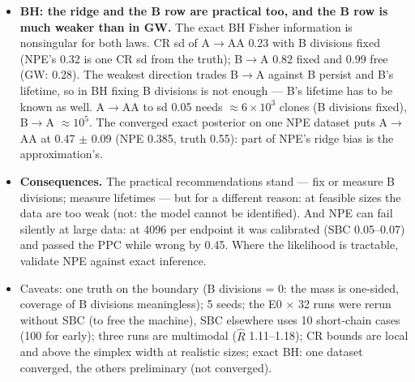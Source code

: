 \documentclass[10pt,a4paper]{article}
\newcommand{\code}[1]{\texttt{\detokenize{#1}}}
\begin{document}
\begin{itemize}
\item \textbf{BH: the ridge and the B row are practical too, and the B row is much weaker than in GW.} The exact BH Fisher information is nonsingular for both laws. CR sd of A$\to$AA 0.23 with B divisions fixed (NPE's 0.32 is one CR sd from the truth); B$\to$A 0.82 fixed and 0.99 free (GW: 0.28). The weakest direction trades B$\to$A against B persist and B's lifetime, so in BH fixing B divisions is not enough --- B's lifetime has to be known as well. A$\to$AA to sd 0.05 needs $\approx 6\times10^3$ clones (B divisions fixed), B$\to$A $\approx 10^5$. The converged exact posterior on one NPE dataset puts A$\to$AA at 0.47 $\pm$ 0.09 (NPE 0.385, truth 0.55): part of NPE's ridge bias is the approximation's.
\item \textbf{Consequences.} The practical recommendations stand --- fix or measure B divisions; measure lifetimes --- but for a different reason: at feasible sizes the data are too weak (not: the model cannot be identified). And NPE can fail silently at large data: at 4096 per endpoint it was calibrated (SBC 0.05--0.07) and passed the PPC while wrong by 0.45. Where the likelihood is tractable, validate NPE against exact inference.
\item Caveats: one truth on the boundary (B divisions = 0: the mass is one-sided, coverage of B divisions meaningless); 5 seeds; the E0 $\times$ 32 \code{two_type} runs were rerun without SBC (to free the machine), SBC elsewhere uses 10 short-chain cases (100 for early); three runs are multimodal ($\hat R$ 1.11--1.18); CR bounds are local and above the simplex width at realistic sizes; exact BH: one dataset converged, the others preliminary (not converged).
\end{itemize}

\end{document}

